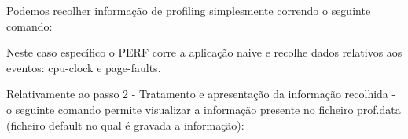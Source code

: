 \documentclass[conference,compsoc]{IEEEtran}
\begin{document}
\begin{itemize}
Podemos recolher informação de profiling simplesmente correndo o seguinte comando:

Neste caso específico o PERF corre a aplicação naive e recolhe dados relativos aos eventos: cpu-clock e page-faults. 


Relativamente ao passo 2 - Tratamento e apresentação da informação recolhida - o seguinte comando permite visualizar a informação presente no ficheiro prof.data (ficheiro default no qual é gravada a informação): \par 












\end{itemize}
\end{document}
